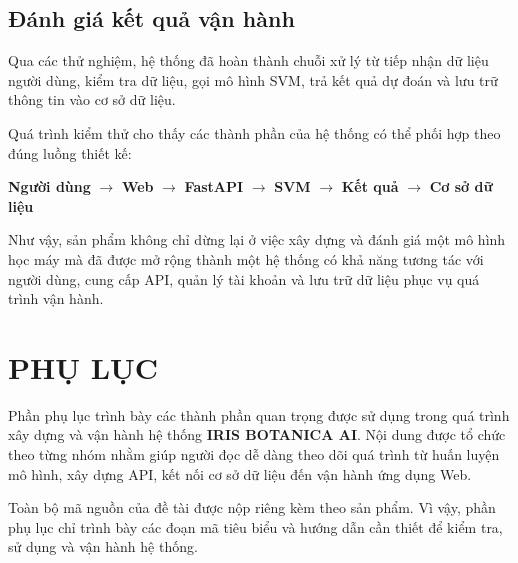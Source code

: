 \documentclass[14pt]{extarticle}
\begin{document}
	\subsection{Đánh giá kết quả vận hành}
	
	\noindent Qua các thử nghiệm, hệ thống đã hoàn thành chuỗi xử lý từ tiếp nhận dữ liệu người dùng, kiểm tra dữ liệu, gọi mô hình SVM, trả kết quả dự đoán và lưu trữ thông tin vào cơ sở dữ liệu.
	
	\noindent Quá trình kiểm thử cho thấy các thành phần của hệ thống có thể phối hợp theo đúng luồng thiết kế:
	
	\begin{center}
		\textbf{Người dùng}
		$\rightarrow$
		\textbf{Web}
		$\rightarrow$
		\textbf{FastAPI}
		$\rightarrow$
		\textbf{SVM}
		$\rightarrow$
		\textbf{Kết quả}
		$\rightarrow$
		\textbf{Cơ sở dữ liệu}
	\end{center}
	
	\noindent Như vậy, sản phẩm không chỉ dừng lại ở việc xây dựng và đánh giá một mô hình học máy mà đã được mở rộng thành một hệ thống có khả năng tương tác với người dùng, cung cấp API, quản lý tài khoản và lưu trữ dữ liệu phục vụ quá trình vận hành.
	

	\newpage 

	
	
	
	\newpage
	\section*{PHỤ LỤC}
	
	\noindent
	Phần phụ lục trình bày các thành phần quan trọng được sử dụng trong quá
	trình xây dựng và vận hành hệ thống \textbf{IRIS BOTANICA AI}. Nội dung
	được tổ chức theo từng nhóm nhằm giúp người đọc dễ dàng theo dõi quá trình
	từ huấn luyện mô hình, xây dựng API, kết nối cơ sở dữ liệu đến vận hành
	ứng dụng Web.
	
	\noindent
	Toàn bộ mã nguồn của đề tài được nộp riêng kèm theo sản phẩm. Vì vậy,
	phần phụ lục chỉ trình bày các đoạn mã tiêu biểu và hướng dẫn cần thiết
	để kiểm tra, sử dụng và vận hành hệ thống.
	
	
	
\end{document}
